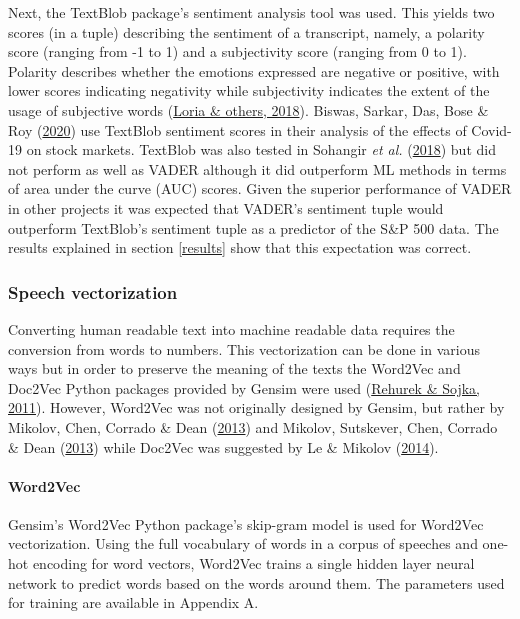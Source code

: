 \documentclass[11pt,preprint, authoryear]{elsarticle}
\numberwithin{equation}{section}
\numberwithin{figure}{section}
\numberwithin{table}{section}
\begin{document}
Next, the TextBlob package's sentiment analysis tool was used. This
yields two scores (in a tuple) describing the sentiment of a transcript,
namely, a polarity score (ranging from -1 to 1) and a subjectivity score
(ranging from 0 to 1). Polarity describes whether the emotions expressed
are negative or positive, with lower scores indicating negativity while
subjectivity indicates the extent of the usage of subjective words
(\protect\hyperlink{ref-loria2018textblob}{Loria \& others, 2018}).
Biswas, Sarkar, Das, Bose \& Roy
(\protect\hyperlink{ref-biswas2020examining}{2020}) use TextBlob
sentiment scores in their analysis of the effects of Covid-19 on stock
markets. TextBlob was also tested in Sohangir \emph{et al.}
(\protect\hyperlink{ref-sohangir2018financial}{2018}) but did not
perform as well as VADER although it did outperform ML methods in terms
of area under the curve (AUC) scores. Given the superior performance of
VADER in other projects it was expected that VADER's sentiment tuple
would outperform TextBlob's sentiment tuple as a predictor of the S\&P
500 data. The results explained in section \ref{results} show that this
expectation was correct.

\hypertarget{speech-vectorization}{%
\subsubsection{Speech vectorization}\label{speech-vectorization}}

Converting human readable text into machine readable data requires the
conversion from words to numbers. This vectorization can be done in
various ways but in order to preserve the meaning of the texts the
Word2Vec and Doc2Vec Python packages provided by Gensim were used
(\protect\hyperlink{ref-rehurek2011gensim}{Rehurek \& Sojka, 2011}).
However, Word2Vec was not originally designed by Gensim, but rather by
Mikolov, Chen, Corrado \& Dean
(\protect\hyperlink{ref-mikolov2013efficient}{2013}) and Mikolov,
Sutskever, Chen, Corrado \& Dean
(\protect\hyperlink{ref-mikolov2013distributed}{2013}) while Doc2Vec was
suggested by Le \& Mikolov
(\protect\hyperlink{ref-le2014distributed}{2014}).

\hypertarget{word2vec}{%
\paragraph{Word2Vec}\label{word2vec}}

Gensim's Word2Vec Python package's skip-gram model is used for Word2Vec
vectorization. Using the full vocabulary of words in a corpus of
speeches and one-hot encoding for word vectors, Word2Vec trains a single
hidden layer neural network to predict words based on the words around
them. The parameters used for training are available in Appendix A.
\end{document}

